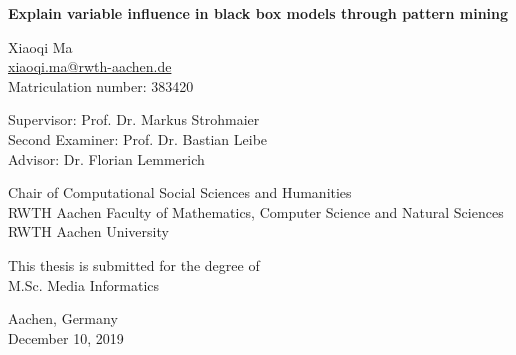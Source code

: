 \begin{titlepage}
    \begin{center}
        \vspace*{1cm}
        
        \huge
        \textbf{Explain variable influence in black box models through pattern mining}
        
        \vspace{2cm}
        
        \large
        Xiaoqi Ma \\
        \href{mailto:xiaoqi.ma@rwth-aachen.de}{xiaoqi.ma@rwth-aachen.de} \\
        Matriculation number: 383420

        \vspace{1cm}

        Supervisor: Prof. Dr. Markus Strohmaier \\
        Second Examiner: Prof. Dr. Bastian Leibe\\
        Advisor: Dr. Florian Lemmerich \\

        \vspace{1.5cm}

        Chair of Computational Social Sciences and Humanities \\
        RWTH Aachen Faculty of Mathematics, Computer Science and Natural Sciences \\
        RWTH Aachen University 
        
        \vfill
        
        This thesis is submitted for the degree of \\
        M.Sc. Media Informatics
        
        \vspace{3cm}
        
        Aachen, Germany \\
        December 10, 2019
        
        
    \end{center}
\end{titlepage}